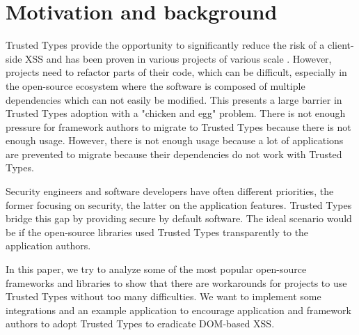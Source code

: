 \section{Motivation and background}

Trusted Types provide the opportunity to significantly reduce the risk of a client-side XSS and has
been proven in various projects of various scale \cite{tt_web_framework_paper}
\cite{tt_integration_list}. However, projects need to refactor parts of their code, which can be
difficult, especially in the open-source ecosystem where the software is composed of multiple
dependencies which can not easily be modified. This presents a large barrier in Trusted Types
adoption \cite{tt_web_framework_paper} with a "chicken and egg" problem. There is not enough
pressure for framework authors to migrate to Trusted Types because there is not enough usage.
However, there is not enough usage because a lot of applications are prevented to migrate because
their dependencies do not work with Trusted Types.

Security engineers and software developers have often different priorities, the former focusing on
security, the latter on the application features. Trusted Types bridge this gap by providing secure
by default software. The ideal scenario would be if the open-source libraries used Trusted Types
transparently to the application authors.

In this paper, we try to analyze some of the most popular open-source frameworks and libraries to
show that there are workarounds for projects to use Trusted Types without too many difficulties. We
want to implement some integrations and an example application to encourage application and
framework authors to adopt Trusted Types to eradicate DOM-based XSS.
